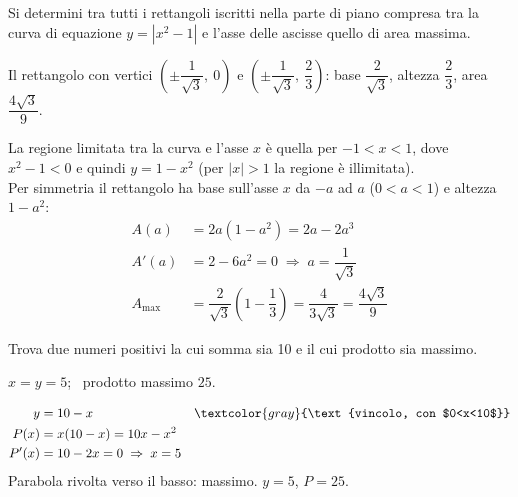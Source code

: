 
\begin{question}[ID=3.5, subtitle={Rettangolo di massima area inscritto in $y=|x^2-1|$}, tags={ottimizzazione, geometria}, difficulty=difficile]
Si determini tra tutti i rettangoli iscritti nella parte di piano compresa tra la curva di equazione \(y = |x^2 - 1|\) e l'asse delle ascisse quello di area massima.
\begin{solution}
Il rettangolo con vertici $\left(\pm\dfrac{1}{\sqrt3},\ 0\right)$ e $\left(\pm\dfrac{1}{\sqrt3},\ \dfrac23\right)$: base $\dfrac{2}{\sqrt3}$, altezza $\dfrac23$, area $\dfrac{4\sqrt3}{9}$.
\end{solution}
\begin{explanation}
La regione limitata tra la curva e l'asse $x$ è quella per $-1<x<1$, dove $x^2-1<0$ e quindi $y=1-x^2$ (per $|x|>1$ la regione è illimitata). \\
Per simmetria il rettangolo ha base sull'asse $x$ da $-a$ ad $a$ ($0<a<1$) e altezza $1-a^2$:
\[\begin{aligned}
A(a) &= 2a(1-a^2)=2a-2a^3\\
A'(a) &= 2-6a^2=0 \;\Rightarrow\; a=\dfrac{1}{\sqrt3}\\
A_{\max} &= \dfrac{2}{\sqrt3}\left(1-\dfrac13\right)=\dfrac{4}{3\sqrt3}=\dfrac{4\sqrt3}{9}
\end{aligned}\]
\end{explanation}
\end{question}


\begin{question}[ID=4.1, subtitle={Due numeri positivi di somma 10 e prodotto massimo}, tags={ottimizzazione, algebra}, difficulty=facile]
Trova due numeri positivi la cui somma sia 10 e il cui prodotto sia massimo.
\begin{solution}
$x=y=5$; \ prodotto massimo $25$.
\end{solution}
\begin{explanation}
\[\begin{aligned}
y &= 10-x && \textcolor{gray}{\text{vincolo, con $0<x<10$}}\\
P(x) &= x(10-x)=10x-x^2\\
P'(x) &= 10-2x=0 \;\Rightarrow\; x=5
\end{aligned}\]
Parabola rivolta verso il basso: massimo. $y=5$, $P=25$.
\end{explanation}
\end{question}


